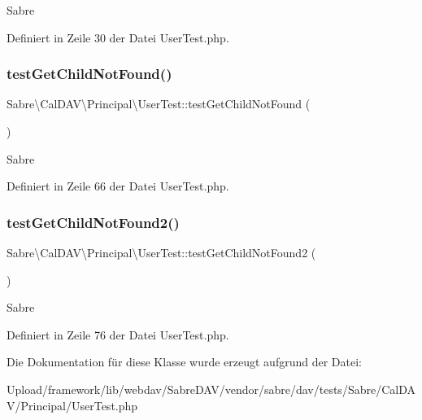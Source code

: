 Sabre 

Definiert in Zeile 30 der Datei User\+Test.\+php.

\mbox{\label{class_sabre_1_1_cal_d_a_v_1_1_principal_1_1_user_test_aeba3d4115d765ccce1a4d0f68f602ede}} 
\subsubsection{\texorpdfstring{test\+Get\+Child\+Not\+Found()}{testGetChildNotFound()}}
{\footnotesize\ttfamily Sabre\textbackslash{}\+Cal\+D\+A\+V\textbackslash{}\+Principal\textbackslash{}\+User\+Test\+::test\+Get\+Child\+Not\+Found (\begin{DoxyParamCaption}{ }\end{DoxyParamCaption})}

Sabre 

Definiert in Zeile 66 der Datei User\+Test.\+php.

\mbox{\label{class_sabre_1_1_cal_d_a_v_1_1_principal_1_1_user_test_ac91c7d1d253e2eba6cf740e487f9c27b}} 
\subsubsection{\texorpdfstring{test\+Get\+Child\+Not\+Found2()}{testGetChildNotFound2()}}
{\footnotesize\ttfamily Sabre\textbackslash{}\+Cal\+D\+A\+V\textbackslash{}\+Principal\textbackslash{}\+User\+Test\+::test\+Get\+Child\+Not\+Found2 (\begin{DoxyParamCaption}{ }\end{DoxyParamCaption})}

Sabre 

Definiert in Zeile 76 der Datei User\+Test.\+php.



Die Dokumentation für diese Klasse wurde erzeugt aufgrund der Datei\+:\begin{DoxyCompactItemize}
\item 
Upload/framework/lib/webdav/\+Sabre\+D\+A\+V/vendor/sabre/dav/tests/\+Sabre/\+Cal\+D\+A\+V/\+Principal/User\+Test.\+php\end{DoxyCompactItemize}

